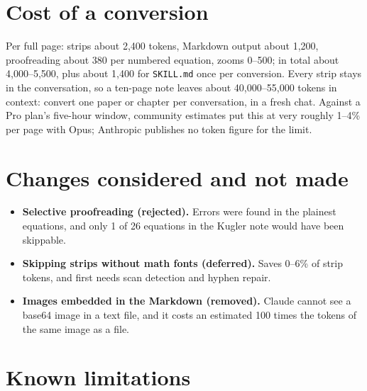 \documentclass[11pt]{article}
\newcommand{\file}[1]{\texttt{#1}}
\begin{document}
\section{Cost of a conversion}

Per full page: strips about 2{,}400 tokens, Markdown output about 1{,}200,
proofreading about 380 per numbered equation, zooms 0--500; in total about
4{,}000--5{,}500, plus about 1{,}400 for \file{SKILL.md} once per conversion.
Every strip stays in the conversation, so a ten-page note leaves about
40{,}000--55{,}000 tokens in context: convert one paper or chapter per
conversation, in a fresh chat. Against a Pro plan's five-hour window, community
estimates put this at very roughly 1--4\% per page with Opus; Anthropic publishes
no token figure for the limit.

\section{Changes considered and not made}

\begin{itemize}
\item \textbf{Selective proofreading (rejected).} Errors were found in the
  plainest equations, and only 1 of 26 equations in the Kugler note would have
  been skippable.
\item \textbf{Skipping strips without math fonts (deferred).} Saves 0--6\% of
  strip tokens, and first needs scan detection and hyphen repair.
\item \textbf{Images embedded in the Markdown (removed).} Claude cannot see a
  base64 image in a text file, and it costs an estimated 100 times the tokens of
  the same image as a file.
\end{itemize}

\section{Known limitations}
\label{sec:limits}
\end{document}
